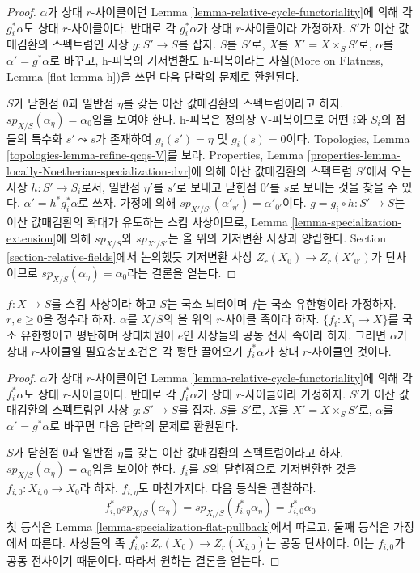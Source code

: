 \begin{proof}
$\alpha$가 상대 $r$-사이클이면 Lemma
\ref{lemma-relative-cycle-functoriality}에 의해 각 $g_i^*\alpha$도
상대 $r$-사이클이다. 반대로 각 $g_i^*\alpha$가 상대 $r$-사이클이라
가정하자. $S'$가 이산 값매김환의 스펙트럼인 사상
$g : S' \to S$를 잡자. $S$를 $S'$로, $X$를
$X' = X \times_S S'$로, $\alpha$를 $\alpha' = g^*\alpha$로 바꾸고,
h-피복의 기저변환도 h-피복이라는 사실(More on Flatness, Lemma
\ref{flat-lemma-h})을 쓰면 다음 단락의 문제로 환원된다.

\medskip\noindent
$S$가 닫힌점 $0$과 일반점 $\eta$를 갖는 이산 값매김환의
스펙트럼이라고 하자. $sp_{X/S}(\alpha_\eta) = \alpha_0$임을 보여야
한다. h-피복은 정의상 V-피복이므로 어떤 $i$와 $S_i$의 점들의
특수화 $s' \leadsto s$가 존재하여 $g_i(s') = \eta$ 및
$g_i(s) = 0$이다. Topologies, Lemma
\ref{topologies-lemma-refine-qcqs-V}를 보라. Properties, Lemma
\ref{properties-lemma-locally-Noetherian-specialization-dvr}에 의해
이산 값매김환의 스펙트럼 $S'$에서 오는 사상 $h : S' \to S_i$로서,
일반점 $\eta'$를 $s'$로 보내고 닫힌점 $0'$를 $s$로 보내는 것을
찾을 수 있다. $\alpha' = h^*g_i^*\alpha$로 쓰자. 가정에 의해
$sp_{X'/S'}(\alpha'_{\eta'}) = \alpha'_{0'}$이다.
$g = g_i \circ h : S' \to S$는 이산 값매김환의 확대가 유도하는
스킴 사상이므로, Lemma \ref{lemma-specialization-extension}에 의해
$sp_{X/S}$와 $sp_{X'/S'}$는 올 위의 기저변환 사상과 양립한다.
Section \ref{section-relative-fields}에서 논의했듯 기저변환 사상
$Z_r(X_0) \to Z_r(X'_{0'})$가 단사이므로
$sp_{X/S}(\alpha_\eta) = \alpha_0$라는 결론을 얻는다.
\end{proof}

\begin{lemma}
\label{lemma-families-specialization-fppf-descent}
$f : X \to S$를 스킴 사상이라 하고 $S$는 국소 뇌터이며 $f$는
국소 유한형이라 가정하자. $r, e \geq 0$을 정수라 하자.
$\alpha$를 $X/S$의 올 위의 $r$-사이클 족이라 하자.
$\{f_i : X_i \to X\}$를 국소 유한형이고 평탄하며 상대차원이
$e$인 사상들의 공동 전사 족이라 하자. 그러면 $\alpha$가 상대
$r$-사이클일 필요충분조건은 각 평탄 끌어오기 $f_i^*\alpha$가
상대 $r$-사이클인 것이다.
\end{lemma}

\begin{proof}
$\alpha$가 상대 $r$-사이클이면 Lemma
\ref{lemma-relative-cycle-functoriality}에 의해 각 $f_i^*\alpha$도
상대 $r$-사이클이다. 반대로 각 $f_i^*\alpha$가 상대 $r$-사이클이라
가정하자. $S'$가 이산 값매김환의 스펙트럼인 사상
$g : S' \to S$를 잡자. $S$를 $S'$로, $X$를
$X' = X \times_S S'$로, $\alpha$를 $\alpha' = g^*\alpha$로 바꾸면
다음 단락의 문제로 환원된다.

\medskip\noindent
$S$가 닫힌점 $0$과 일반점 $\eta$를 갖는 이산 값매김환의
스펙트럼이라고 하자. $sp_{X/S}(\alpha_\eta) = \alpha_0$임을 보여야
한다. $f_i$를 $S$의 닫힌점으로 기저변환한 것을
$f_{i, 0} : X_{i, 0} \to X_0$라 하자. $f_{i, \eta}$도 마찬가지다.
다음 등식을 관찰하라.
$$
f_{i, 0}^*sp_{X/S}(\alpha_\eta) =
sp_{X_i/S}(f_{i, \eta}^*\alpha_\eta) = f_{i, 0}^*\alpha_0
$$
첫 등식은 Lemma \ref{lemma-specialization-flat-pullback}에서 따르고,
둘째 등식은 가정에서 따른다. 사상들의 족
$f_{i, 0}^* : Z_r(X_0) \to Z_r(X_{i, 0})$는 공동 단사이다.
이는 $f_{i, 0}$가 공동 전사이기 때문이다. 따라서 원하는 결론을 얻는다.
\end{proof}

